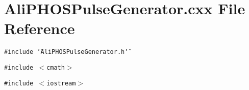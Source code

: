 \section{Ali\-PHOSPulse\-Generator.cxx File Reference}
\label{AliPHOSPulseGenerator_8cxx}
{\tt \#include \char`\"{}Ali\-PHOSPulse\-Generator.h\char`\"{}}\par
{\tt \#include $<$cmath$>$}\par
{\tt \#include $<$iostream$>$}\par
